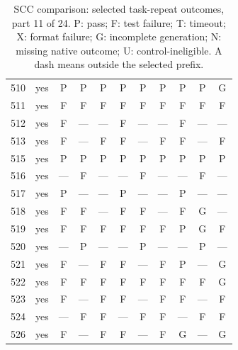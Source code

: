 \begin{table}[p]
\begin{tabular*}{\textwidth}{@{\extracolsep{\fill}}rc*{9}{c}@{}}
510 & yes & P & P & P & P & P & P & P & P & G\\
511 & yes & F & F & F & F & F & F & F & F & F\\
512 & yes & F & — & — & F & — & — & F & — & —\\
513 & yes & F & — & F & F & — & F & F & — & F\\
515 & yes & P & P & P & P & P & P & P & P & P\\
516 & yes & — & F & — & — & F & — & — & F & —\\
517 & yes & P & — & — & P & — & — & P & — & —\\
518 & yes & F & F & — & F & F & — & F & G & —\\
519 & yes & F & F & F & F & F & F & P & G & F\\
520 & yes & — & P & — & — & P & — & — & P & —\\
521 & yes & F & — & F & F & — & F & P & — & G\\
522 & yes & F & F & F & F & F & F & F & F & G\\
523 & yes & F & — & F & F & — & F & F & — & F\\
524 & yes & — & F & F & — & F & F & — & F & F\\
526 & yes & F & — & F & F & — & F & G & — & G\\
\bottomrule\end{tabular*}
\caption{SCC comparison: selected task-repeat outcomes, part 11 of 24. P: pass; F: test failure; T: timeout; X: format failure; G: incomplete generation; N: missing native outcome; U: control-ineligible. A dash means outside the selected prefix.}
\end{table}
\clearpage
